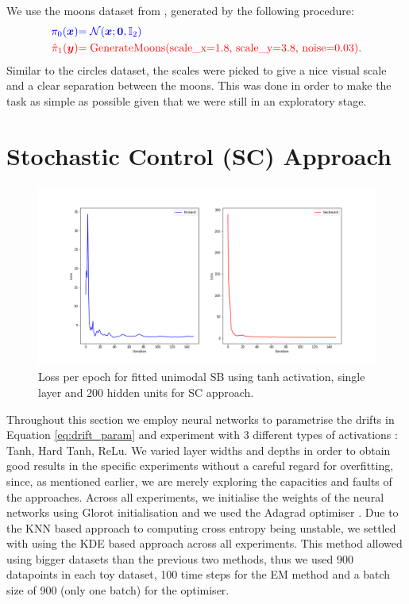 \documentclass[a4paper,12pt,twoside,openright]{report}
\theoremstyle{definition}
\begin{document}
We use the moons dataset from \cite{pedregosa2011scikit}, generated by the following procedure:
\begin{align*}
     \color{blue}{\pi_0({\bm{x}})} &\color{blue}{= {\mathcal{N}}({\bm{x}}; {\bm{0}},  \mathbb{I}_2)} \\
    \color{red}{\hat{\pi}_1({\bm{y}})} &\color{red}{= \text{GenerateMoons(scale\_x=1.8, scale\_y=3.8, noise=0.03)}}.
\end{align*}
Similar to the circles dataset, the scales were picked to give a nice visual scale and a clear separation between the moons. This was done in order to make the task as simple as possible given that we were still in an exploratory stage.


\section{Stochastic Control (SC)  Approach}
\begin{figure}
    \centering
    \includegraphics[scale=0.4,trim={2.3cm 1cm 2.5cm 0cm}, clip]{images/Control/big_var_loss.png}
    \caption{Loss per epoch for fitted unimodal SB using tanh activation, single layer and 200 hidden units for SC approach.}
    \label{fig:epochsbigvarnn}
\end{figure}
Throughout this section we employ neural networks \citep{lecun2015deep} to parametrise the drifts in Equation \ref{eq:drift_param} and experiment with 3 different types of activations : Tanh, Hard Tanh, ReLu.  We varied layer widths and depths in order  to obtain good results in the specific experiments without a careful regard for overfitting, since, as mentioned earlier, we are merely exploring the capacities and faults of the approaches. Across all experiments, we initialise the weights of the neural networks using Glorot initialisation \citep{glorot2010understanding} and we used the Adagrad optimiser \citep{duchi2011adaptive}. Due to the KNN based approach to computing cross entropy being unstable, we settled with using the KDE based approach across all experiments. This method allowed using bigger datasets than the previous two methods, thus we used 900 datapoints in each toy dataset, 100 time steps for the EM method and a batch size of 900 (only one batch) for the optimiser. 
\end{document}
